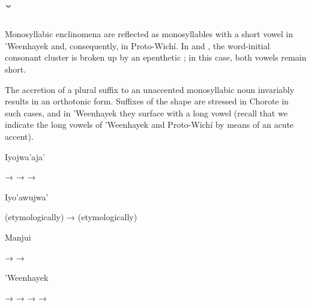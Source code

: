\subsection{˘} \label{corta}
Monosyllabic enclinomena are reflected as monosyllables with a short vowel in ’Weenhayek and, consequently, in Proto-Wichí. In  and , the word-initial consonant cluster is broken up by an epenthetic ; in this case, both vowels remain short.

\begin{exe}
    \ex \goaway
    \ex \cry
    \ex \fooditssg
    \ex \najendup
    \ex \wingitssg
    \ex \thorneitssg
    \ex \leech
    \ex \palm \label{corta-palm}
    \ex \lousesg
    \ex \whitesnail
    \ex \mesh \label{corta-mesh}
    \ex \sprout
    \ex \suckb
    \ex \swallow
    \ex \invite
    \ex \dig
    \ex \eatvt
    \ex \spillcwimp
    \ex \grass
    \ex \cordits
    \ex \diecw
    \ex \stepv
    \ex \skinits
    \ex \eatvi
    \ex \dryout
    \ex \good
    \ex \extinguished
    \ex \ripe
\end{exe}

The accretion of a plural suffix to an unaccented monosyllabic noun invariably results in an orthotonic form. Suffixes of the shape  are stressed in Chorote in such cases, and in ’Weenhayek they surface with a long vowel (recall that we indicate the long vowels of ’Weenhayek and Proto-Wichí by means of an acute accent).

\newpage
{}
\ea \label{ex:corta-plural:ijw}
    Iyojwa’aja’ \citep[92]{JC14b}
    \begin{xlist}
        \ex {} → 
        \ex {} → 
        \ex {} → 
    \end{xlist}
\z
\ea \label{ex:corta-plural:i'w}
    Iyo’awujwa’ \citep[176]{AG83}
    \begin{xlist}
        \ex {} (etymologically) →  (etymologically)
    \end{xlist}
\z
\ea  \label{ex:corta-plural:mj}
    Manjui \citep{JC18}
    \begin{xlist}
        \ex {} → 
        \ex {} → 
    \end{xlist}
\z
\ea \label{ex:corta-plural:whk}
    ’Weenhayek \citep[95, 96, 158, 235]{KC16}\\
    \begin{xlist}
        \ex {} → 
        \ex {} → 
        \ex {} → 
        \ex {} → 
    \end{xlist}
\z
{}

